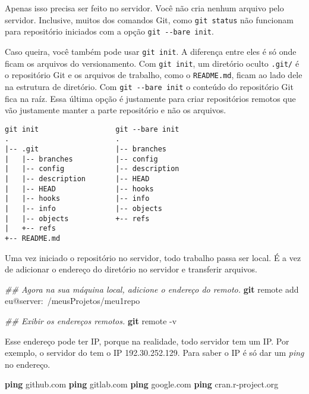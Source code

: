 \documentclass[
  a5paper,
  pagesize,
  9pt,
  pointlessnumbers,
  normalheadings,
  twoside=false
]{book}
\newenvironment{Shaded}{\begin{snugshade}}{\end{snugshade}}
\newcommand{\KeywordTok}[1]{\textcolor[rgb]{0.13,0.29,0.53}{\textbf{{#1}}}}
\newcommand{\CommentTok}[1]{\textcolor[rgb]{0.56,0.35,0.01}{\textit{{#1}}}}
\newcommand{\NormalTok}[1]{{#1}}
\begin{document}
Apenas isso precisa ser feito no servidor. Você não cria nenhum arquivo
pelo servidor. Inclusive, muitos dos comandos Git, como
\texttt{git status} não funcionam para repositório iniciados com a opção
\texttt{git -\/-bare init}.

Caso queira, você também pode usar \texttt{git init}. A diferença entre
eles é só onde ficam os arquivos do versionamento. Com
\texttt{git init}, um diretório oculto \texttt{.git/} é o repositório
Git e os arquivos de trabalho, como o \texttt{README.md}, ficam ao lado
dele na estrutura de diretório. Com \texttt{git -\/-bare init} o
conteúdo do repositório Git fica na raíz. Essa última opção é justamente
para criar repositórios remotos que vão justamente manter a parte
repositório e não os arquivos.

\begin{verbatim}
git init                  git --bare init
.                         .
|-- .git                  |-- branches
|   |-- branches          |-- config
|   |-- config            |-- description
|   |-- description       |-- HEAD
|   |-- HEAD              |-- hooks
|   |-- hooks             |-- info
|   |-- info              |-- objects
|   |-- objects           +-- refs
|   +-- refs
+-- README.md
\end{verbatim}

Uma vez iniciado o repositório no servidor, todo trabalho passa ser
local. É a vez de adicionar o endereço do diretório no servidor e
transferir arquivos.

\begin{Shaded}
\begin{Highlighting}[]
\CommentTok{## Agora na sua máquina local, adicione o endereço do remoto.}
\KeywordTok{git} \NormalTok{remote add eu@server:~/meusProjetos/meu1repo}

\CommentTok{## Exibir os endereços remotos.}
\KeywordTok{git} \NormalTok{remote -v}
\end{Highlighting}
\end{Shaded}

Esse endereço pode ter IP, porque na realidade, todo servidor tem um IP.
Por exemplo, o servidor do tem o IP 192.30.252.129. Para saber o IP é só
dar um \emph{ping} no endereço.

\begin{Shaded}
\begin{Highlighting}[]
\KeywordTok{ping} \NormalTok{github.com}
\KeywordTok{ping} \NormalTok{gitlab.com}
\KeywordTok{ping} \NormalTok{google.com}
\KeywordTok{ping} \NormalTok{cran.r-project.org}
\end{Highlighting}
\end{Shaded}
\end{document}
